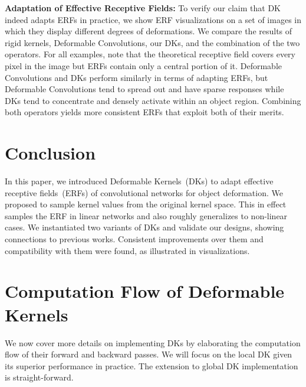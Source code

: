 \documentclass{article} \usepackage{iclr2020_conference, times}
\newcommand{\bfsection}[1]{\noindent\textbf{#1:}}
\begin{document}
\bfsection{Adaptation of Effective Receptive Fields}
To verify our claim that DK indeed adapts ERFs in practice, we show
ERF visualizations on a set of images in which they display different
degrees of deformations.
We compare the results of rigid kernels, Deformable Convolutions, our DKs, and
the combination of the two operators.
For all examples, note that the theoretical receptive field covers every pixel
in the image but ERFs contain only a central portion of it.
Deformable Convolutions and DKs perform similarly in terms of adapting ERFs,
but Deformable Convolutions tend to spread out and have sparse responses while
DKs tend to concentrate and densely activate within an object region.
Combining both operators yields more consistent ERFs that exploit both of their
merits.
 \section{Conclusion}

In this paper, we introduced Deformable Kernels~(DKs) to adapt effective
receptive fields~(ERFs) of convolutional networks for object deformation.
We proposed to sample kernel values from the original kernel space.
This in effect samples the ERF in linear networks and also roughly generalizes
to non-linear cases.
We instantiated two variants of DKs and validate our designs, showing
connections to previous works.
Consistent improvements over them and compatibility with them were found, as
illustrated in visualizations.
 



\clearpage
\appendix
\section{Computation Flow of Deformable Kernels}

We now cover more details on implementing DKs by elaborating the computation
flow of their forward and backward passes.
We will focus on the local DK given its superior performance in practice.
The extension to global DK implementation is straight-forward.
\end{document}
